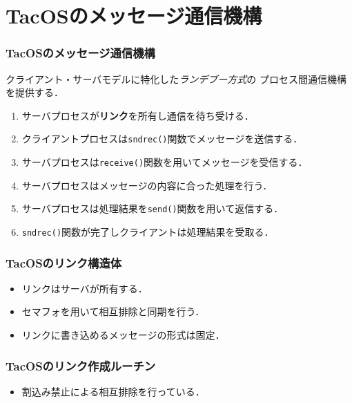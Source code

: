 \documentclass[unicode,handout]{beamer}                   %
\begin{document}
\section{TacOSのメッセージ通信機構}
\begin{frame}
  \frametitle{TacOSのメッセージ通信機構}
  クライアント・サーバモデルに特化した\emph{ランデブー方式}の
  プロセス間通信機構を提供する．
  \vfill
  \vfill
  \begin{enumerate}
  \item[1.] サーバプロセスが{\bf リンク}を所有し通信を待ち受ける．
  \item[2.] クライアントプロセスは{\tt sndrec()}関数でメッセージを送信する．
  \item[3.] サーバプロセスは{\tt receive()}関数を用いてメッセージを受信する．
  \item[4.] サーバプロセスはメッセージの内容に合った処理を行う．
  \item[5.] サーバプロセスは処理結果を{\tt send()}関数を用いて返信する．
  \item[6.] {\tt sndrec()}関数が完了しクライアントは処理結果を受取る．
  \end{enumerate}
  \vfill
\end{frame}

\begin{frame}
  \frametitle{TacOSのリンク構造体}
  \begin{itemize}
  \item リンクはサーバが所有する．
  \item セマフォを用いて相互排除と同期を行う．
  \item リンクに書き込めるメッセージの形式は固定．
  \end{itemize}
\end{frame}

\begin{frame}
  \frametitle{TacOSのリンク作成ルーチン}
  \begin{itemize}
  \item 割込み禁止による相互排除を行っている．
  \end{itemize}
\end{frame}
\end{document}
